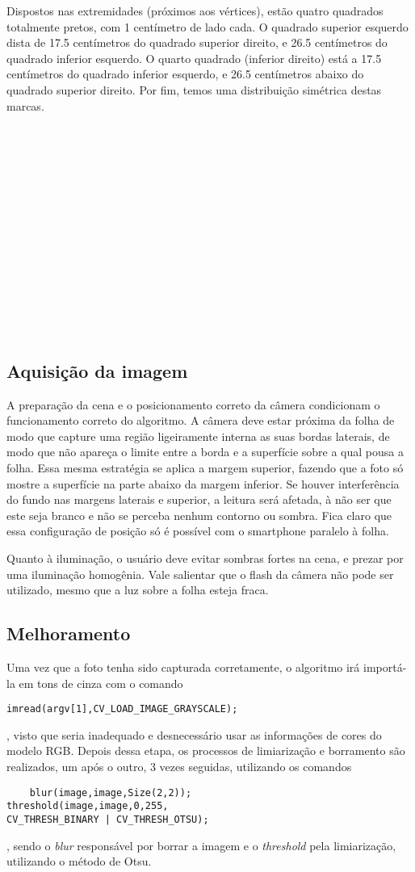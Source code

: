 \documentclass[conference,harvard,brazil,english]{sbatex}
\begin{document}
	Dispostos nas extremidades (próximos aos vértices), estão quatro quadrados totalmente pretos, com 1 centímetro de lado cada. O quadrado superior esquerdo dista de 17.5 centímetros do quadrado superior direito, e 26.5 centímetros do quadrado inferior esquerdo. O quarto quadrado (inferior direito) está a 17.5 centímetros  do quadrado inferior esquerdo, e 26.5 centímetros abaixo do quadrado superior direito. Por fim, temos uma distribuição simétrica destas marcas.
\\ \\ \\ \\ \\ \\ \\ \\ \\ \\ \\ \\ \\ \\ \\

\subsection{Aquisição da imagem}
	A preparação da cena e o posicionamento correto da câmera condicionam o funcionamento correto do algoritmo.
	A câmera deve estar próxima da folha de modo que capture uma região ligeiramente interna as suas bordas laterais, de modo que não apareça o limite entre a borda e a superfície sobre a qual pousa a folha. Essa mesma estratégia se aplica a margem superior, fazendo que a foto só mostre a superfície na parte abaixo da margem inferior. Se houver interferência do fundo nas margens laterais e superior, a leitura será afetada, à não ser que este seja branco e não se perceba nenhum contorno ou sombra. Fica claro que essa configuração de posição só é possível com o smartphone paralelo à folha.
	
	Quanto à iluminação, o usuário deve evitar sombras fortes na cena, e prezar por uma iluminação homogênia. Vale salientar que o flash da câmera não pode ser utilizado, mesmo que a luz sobre a folha esteja fraca. 

\subsection{Melhoramento}

	Uma vez que a foto tenha sido capturada corretamente, o algoritmo irá importá-la em tons de cinza com o comando \begin{verbatim}
imread(argv[1],CV_LOAD_IMAGE_GRAYSCALE);
\end{verbatim} 
, visto que seria inadequado e desnecessário usar as informações de cores do modelo RGB.
	Depois dessa etapa, os processos de limiarização e borramento são realizados, um após o outro, 3 vezes seguidas, utilizando os comandos \begin{verbatim}
	blur(image,image,Size(2,2));
threshold(image,image,0,255,
CV_THRESH_BINARY | CV_THRESH_OTSU);
	\end{verbatim}, sendo o \emph{blur} responsável por borrar a imagem e o \emph{threshold} pela limiarização, utilizando o método de Otsu.
\end{document}

